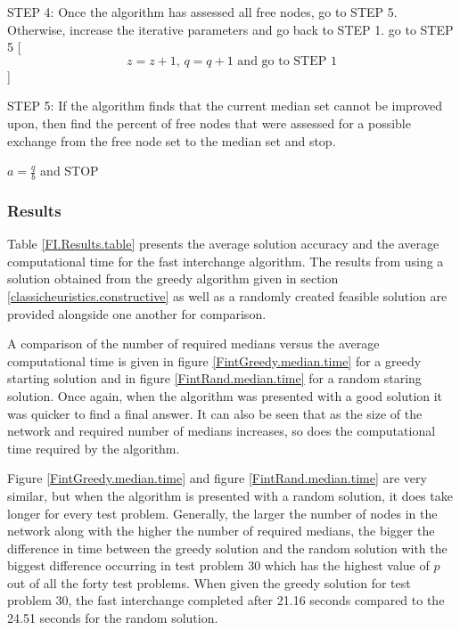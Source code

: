 \documentclass[11pt]{article}
\begin{document}
\begin{algorithm}
\begin{algorithmic}[0]
			
			\Statex
			\Statex STEP 4: Once the algorithm has assessed all free nodes, go to STEP 5. Otherwise, increase the iterative parameters and go back to STEP 1.
			\Statex go to STEP 5
			[
			\begin{equation*}
			z=z+1 \text{, } q=q+1 \text{ and go to STEP 1}
			\end{equation*}
			]
			\EndIf

			
			\Statex
			\Statex STEP 5: If the algorithm finds that the current median set cannot be improved upon, then find the percent of free nodes that were assessed for a possible exchange from the free node set to the median set and stop.
			\begin{center}
				$a=\frac{q}{b}$ and STOP
			\end{center}
			
		\end{algorithmic}
	\end{algorithm}

	\subsubsection{Results}
	Table \ref{FI.Results.table} presents the average solution accuracy and the average computational time for the fast interchange algorithm.  The results from using a solution obtained from the greedy algorithm given in section \ref{classicheuristics.constructive} as well as a randomly created feasible solution are provided alongside one another for comparison.
	
	A comparison of the number of required medians versus the average computational time is given in figure \ref{FintGreedy.median.time} for a greedy starting solution and in figure \ref{FintRand.median.time} for a random staring solution.  Once again, when the algorithm was presented with a good solution it was quicker to find a final answer.  It can also be seen that as the size of the network and required number of medians increases, so does the computational time required by the algorithm.
	
	Figure \ref{FintGreedy.median.time} and figure \ref{FintRand.median.time} are very similar, but when the algorithm is presented with a random solution, it does take longer for every test problem.  Generally, the larger the number of nodes in the network along with the higher the number of required medians, the bigger the difference in time between the greedy solution and the random solution with the biggest difference occurring in test problem 30 which has the highest value of $p$ out of all the forty test problems.  When given the greedy solution for test problem 30, the fast interchange completed after 21.16 seconds compared to the 24.51 seconds for the random solution.
	
\end{document}
